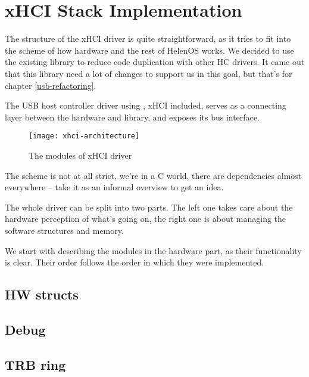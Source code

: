 \chapter{xHCI Stack Implementation}

The structure of the xHCI driver is quite straightforward, as it tries to fit
into the scheme of how hardware and the rest of HelenOS works. We decided to
use the existing library  to reduce code duplication with
other HC drivers. It came out that this library need a lot of changes to
support us in this goal, but that's for chapter \ref{usb-refactoring}.

The USB host controller driver using , xHCI included, serves as
a connecting layer between the hardware and library, and exposes its bus
interface.

\begin{figure}[h]
	\centering
	\texttt{[image: xhci-architecture]}
	\caption{The modules of xHCI driver}
\end{figure}

The scheme is not at all strict, we're in a C world, there are dependencies
almost everywhere -- take it as an informal overview to get an idea.

The whole driver can be split into two parts. The left one takes care about the
hardware perception of what's going on, the right one is about managing the
software structures and memory.

We start with describing the modules in the hardware part, as their
functionality is clear. Their order follows the order in which they were
implemented.

\section{HW structs}



\section{Debug}


\section{TRB ring}

